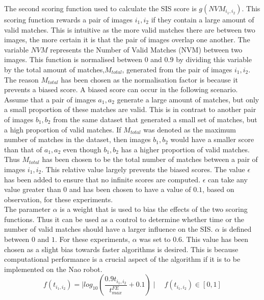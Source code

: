 \documentclass{report}
\begin{document}
The second scoring function used to calculate the SIS score is $g(NVM_{i_1, i_2})$. This scoring function rewards a pair of images $i_1, i_2$ if they contain a large amount of valid matches. This is intuitive as the more valid matches there are between two images, the more certain it is that the pair of images overlap one another. The variable $NVM$ represents the Number of Valid Matches (NVM) between two images. This function is normalised between $0$ and  $0.9$ by dividing this variable by the total amount of matches,$M_{total}$, generated from the pair of images $i_1, i_2$. The reason $M_{total}$ has been chosen as the normalisation factor is because it prevents a biased score. A biased score can occur in the following scenario. Assume that a pair of images $a_1, a_2$ generate a large amount of matches, but only a small proportion of these matches are valid. This is in contrast to another pair of images $b_1, b_2$ from the same dataset that generated a small set of matches, but a high proportion of valid matches. If $M_{total}$ was denoted as the maximum number of matches in the dataset, then images $b_1, b_2$ would have a smaller score than that of $a_1, a_2$ even though $b_1, b_2$ has a higher proportion of valid matches. Thus $M_{total}$ has been chosen to be the total number of matches between a pair of images $i_1, i_2$. This relative value largely prevents the biased scores. The value $\epsilon$ has been added to ensure that no infinite scores are computed. $\epsilon$ can take any value greater than $0$ and has been chosen to have a value of $0.1$, based on observation, for these experiments.\\ 

The parameter $\alpha$ is a weight that is used to bias the effects of the two scoring functions. Thus it can be used as a control to determine whether time or the number of valid matches should have a larger influence on the SIS. $\alpha$ is defined between $0$ and $1$. For these experiments, $\alpha$ was set to $0.6$. This value has been chosen as a slight bias towards faster algorithms is desired. This is because computational performance is a crucial aspect of the algorithm if it is to be implemented on the Nao robot.\\

\begin{equation}
f(t_{i_1, i_2}) = \mid log_{10}(\frac{0.9 t_{i_1, i_2}}{t_{max}^{FE}} + 0.1) \mid \quad f(t_{i_1, i_2})\in [0, 1]
\label{eqn:time}
\end{equation}
\end{document}

